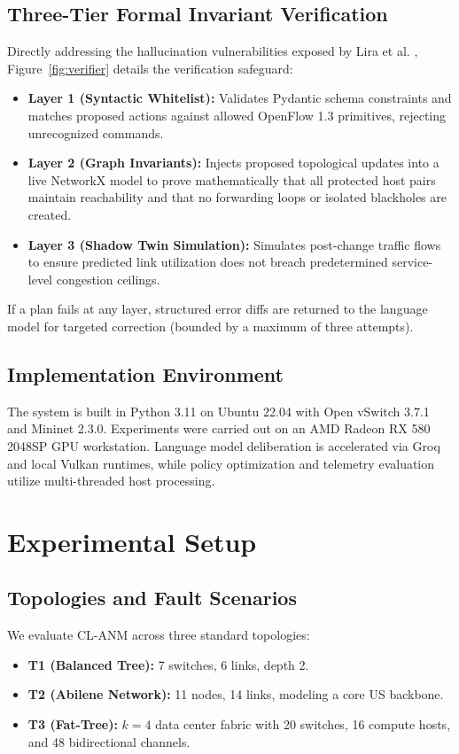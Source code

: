 \documentclass[10pt,twocolumn,a4paper]{article}
\begin{document}
\subsection{Three-Tier Formal Invariant Verification}
Directly addressing the hallucination vulnerabilities exposed by Lira et al. \cite{lira2026}, Figure~\ref{fig:verifier} details the verification safeguard:
\begin{itemize}
    \item \textbf{Layer 1 (Syntactic Whitelist):} Validates Pydantic schema constraints and matches proposed actions against allowed OpenFlow 1.3 primitives, rejecting unrecognized commands.
    \item \textbf{Layer 2 (Graph Invariants):} Injects proposed topological updates into a live NetworkX model to prove mathematically that all protected host pairs maintain reachability and that no forwarding loops or isolated blackholes are created.
    \item \textbf{Layer 3 (Shadow Twin Simulation):} Simulates post-change traffic flows to ensure predicted link utilization does not breach predetermined service-level congestion ceilings.
\end{itemize}
If a plan fails at any layer, structured error diffs are returned to the language model for targeted correction (bounded by a maximum of three attempts).

\subsection{Implementation Environment}
The system is built in Python 3.11 on Ubuntu 22.04 with Open vSwitch 3.7.1 and Mininet 2.3.0. Experiments were carried out on an AMD Radeon RX 580 2048SP GPU workstation. Language model deliberation is accelerated via Groq and local Vulkan runtimes, while policy optimization and telemetry evaluation utilize multi-threaded host processing.

\section{Experimental Setup}

\subsection{Topologies and Fault Scenarios}
We evaluate CL-ANM across three standard topologies:
\begin{itemize}
    \item \textbf{T1 (Balanced Tree):} 7 switches, 6 links, depth 2.
    \item \textbf{T2 (Abilene Network):} 11 nodes, 14 links, modeling a core US backbone.
    \item \textbf{T3 (Fat-Tree):} $k=4$ data center fabric with 20 switches, 16 compute hosts, and 48 bidirectional channels.
\end{itemize}
\end{document}
